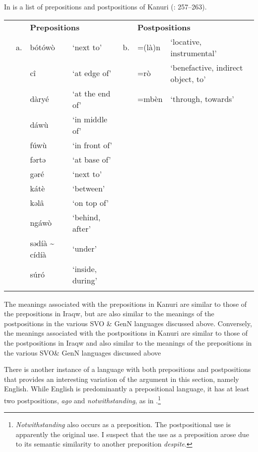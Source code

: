 \documentclass[output=paper]{langsci/langscibook}
\begin{document}
In  is a list of prepositions and postpositions of Kanuri (\citealt{Hutchison1981}: 257–263).


\begin{table}
\begin{tabularx}{\textwidth}{XXXXXXX} 
\lsptoprule
&  & \multicolumn{2}{X}{\bfseries Prepositions} &  & \multicolumn{2}{X}{\bfseries Postpositions}\\
& a. & bótówò & ‘next to’ & b. & =(là)n & ‘locative, instrumental’\\
&  & cî & ‘at edge of’ &  & =rò & ‘benefactive, indirect object, to’\\
&  & dàryé & ‘at the end of’ &  & =mbèn & ‘through, towards’\\
&  & dáwù & ‘in middle of’ &  &  & \\
&  & fúwù & ‘in front of’ &  &  & \\
&  & fərtə & ‘at base of’ &  &  & \\
&  & gəré & ‘next to’ &  &  & \\
&  & kátè & ‘between’ &  &  & \\
&  & kəlâ & ‘on top of’ &  &  & \\
&  & ngáwò & ‘behind, after’ &  &  & \\
&  & sədíà {\textasciitilde} cídíà & ‘under’ &  &  & \\
&  & súró & ‘inside, during’ &  &  & \\
\lspbottomrule
\end{tabularx}
\end{table}

The meanings associated with the prepositions in Kanuri are similar to those of the prepositions in Iraqw, but are also similar to the meanings of the postpositions in the various SVO \& GenN languages discussed above. Conversely, the meanings associated with the postpositions in Kanuri are similar to those of the postpositions in Iraqw and also similar to the meanings of the prepositions in the various SVO\& GenN languages discussed above

There is another instance of a language with both prepositions and postpositions that provides an interesting variation of the argument in this section, namely English. While English is predominantly a prepositional language, it has at least two postpositions, \textit{ago} and \textit{notwithstanding}, as in .\footnote{\textit{Notwithstanding} also occurs as a preposition. The postpositional use is apparently the original use. I suspect that the use as a preposition arose due to its semantic similarity to another preposition \textit{despite}.}
\end{document}
